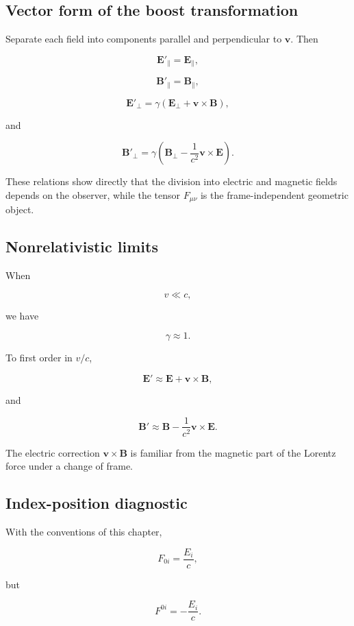 \subsection{Vector form of the boost transformation}

Separate each field into components parallel and perpendicular to \(\mathbf{v}\). Then

\[
\boxed{
\mathbf{E}'_{\parallel}
=
\mathbf{E}_{\parallel}
},
\]

\[
\boxed{
\mathbf{B}'_{\parallel}
=
\mathbf{B}_{\parallel}
},
\]

\[
\boxed{
\mathbf{E}'_{\perp}
=
\gamma
\left(
\mathbf{E}_{\perp}
+
\mathbf{v}\times\mathbf{B}
\right)
},
\]

and

\[
\boxed{
\mathbf{B}'_{\perp}
=
\gamma
\left(
\mathbf{B}_{\perp}
-
\frac{1}{c^2}
\mathbf{v}\times\mathbf{E}
\right)
}.
\]

These relations show directly that the division into electric and magnetic fields depends on the observer, while the tensor \(F_{\mu\nu}\) is the frame-independent geometric object.

\subsection{Nonrelativistic limits}

When

\[
v\ll c,
\]

we have

\[
\gamma\approx1.
\]

To first order in \(v/c\),

\[
\mathbf{E}'
\approx
\mathbf{E}
+
\mathbf{v}\times\mathbf{B},
\]

and

\[
\mathbf{B}'
\approx
\mathbf{B}
-
\frac{1}{c^2}
\mathbf{v}\times\mathbf{E}.
\]

The electric correction \(\mathbf{v}\times\mathbf{B}\) is familiar from the magnetic part of the Lorentz force under a change of frame.

\subsection{Index-position diagnostic}

With the conventions of this chapter,

\[
F_{0i}
=
\frac{E_i}{c},
\]

but

\[
F^{0i}
=
-
\frac{E_i}{c}.
\]

